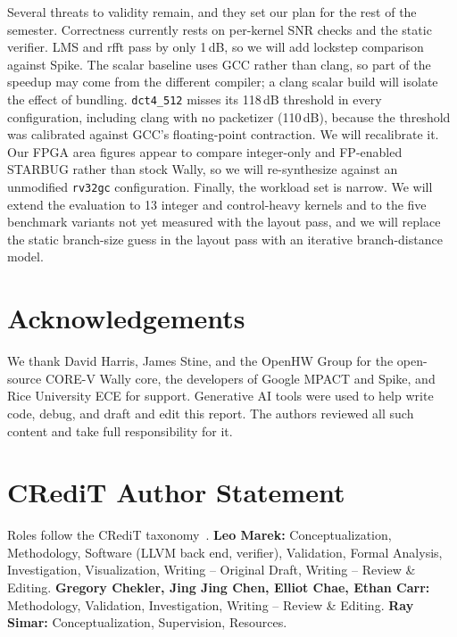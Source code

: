 \documentclass[conference]{IEEEtran}
\begin{document}
Several threats to validity remain, and they set our plan for the rest of the semester. Correctness currently rests on per-kernel SNR checks and the static verifier. LMS and rfft pass by only 1\,dB, so we will add lockstep comparison against Spike. The scalar baseline uses GCC rather than clang, so part of the speedup may come from the different compiler; a clang scalar build will isolate the effect of bundling. \texttt{dct4\_512} misses its 118\,dB threshold in every configuration, including clang with no packetizer (110\,dB), because the threshold was calibrated against GCC's floating-point contraction. We will recalibrate it. Our FPGA area figures appear to compare integer-only and FP-enabled STARBUG rather than stock Wally, so we will re-synthesize against an unmodified \texttt{rv32gc} configuration. Finally, the workload set is narrow. We will extend the evaluation to 13 integer and control-heavy kernels and to the five benchmark variants not yet measured with the layout pass, and we will replace the static branch-size guess in the layout pass with an iterative branch-distance model.

\section*{Acknowledgements}
We thank David Harris, James Stine, and the OpenHW Group for the open-source CORE-V Wally core, the developers of Google MPACT and Spike, and Rice University ECE for support. Generative AI tools were used to help write code, debug, and draft and edit this report. The authors reviewed all such content and take full responsibility for it.

\section*{CRediT Author Statement}
Roles follow the CRediT taxonomy~\cite{credit}. \textbf{Leo Marek:} Conceptualization, Methodology, Software (LLVM back end, verifier), Validation, Formal Analysis, Investigation, Visualization, Writing -- Original Draft, Writing -- Review \& Editing. \textbf{Gregory Chekler, Jing Jing Chen, Elliot Chae, Ethan Carr:} Methodology, Validation, Investigation, Writing -- Review \& Editing. \textbf{Ray Simar:} Conceptualization, Supervision, Resources.



\end{document}
